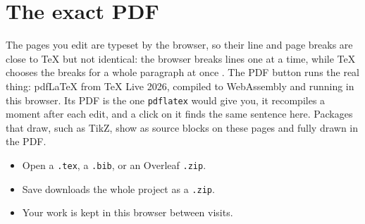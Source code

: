 \documentclass[11pt]{article}
\theoremstyle{definition}
\begin{document}
\section{The exact PDF}
The pages you edit are typeset by the browser, so their line and page breaks are close to \TeX{} but not identical: the browser breaks lines one at a time, while \TeX{} chooses the breaks for a whole paragraph at once \citep{knuthplass1981}. The PDF button runs the real thing: pdf\LaTeX{} from \TeX{} Live 2026, compiled to WebAssembly and running in this browser. Its PDF is the one \texttt{pdflatex} would give you, it recompiles a moment after each edit, and a click on it finds the same sentence here. Packages that draw, such as TikZ, show as source blocks on these pages and fully drawn in the PDF.

\begin{itemize}
  \item Open a \texttt{.tex}, a \texttt{.bib}, or an Overleaf \texttt{.zip}.
  \item Save downloads the whole project as a \texttt{.zip}.
  \item Your work is kept in this browser between visits.
\end{itemize}



\end{document}
